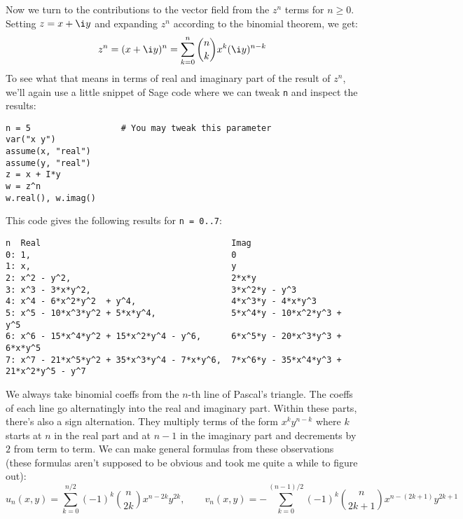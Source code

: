 \documentclass[12pt]{article}
\begin{document}
\medskip
Now we turn to the contributions to the vector field from the $z^n$ terms for $n \geq 0$. Setting $z = x + \i y$ and expanding $z^n$ according to the binomial theorem, we get:
\begin{equation}
z^n = (x + \i y)^n = \sum_{k=0}^n \binom{n}{k}  x^k (\i y)^{n-k}
\end{equation}
To see what that means in terms of real and imaginary part of the result of $z^n$, we'll again use a little snippet of Sage code where we can tweak \texttt{n} and inspect the results:
\begin{verbatim}
n = 5	               # You may tweak this parameter
var("x y")
assume(x, "real")
assume(y, "real")
z = x + I*y
w = z^n
w.real(), w.imag()
\end{verbatim}
This code gives the following results for \texttt{n = 0..7}:
\begin{verbatim}
n  Real                                      Imag
0: 1,                                        0 
1: x,                                        y
2: x^2 - y^2,                                2*x*y
3: x^3 - 3*x*y^2,                            3*x^2*y - y^3
4: x^4 - 6*x^2*y^2  + y^4,                   4*x^3*y - 4*x*y^3
5: x^5 - 10*x^3*y^2 + 5*x*y^4,               5*x^4*y - 10*x^2*y^3 + y^5
6: x^6 - 15*x^4*y^2 + 15*x^2*y^4 - y^6,      6*x^5*y - 20*x^3*y^3 + 6*x*y^5
7: x^7 - 21*x^5*y^2 + 35*x^3*y^4 - 7*x*y^6,  7*x^6*y - 35*x^4*y^3 + 21*x^2*y^5 - y^7
\end{verbatim}
We always take binomial coeffs from the $n$-th line of Pascal's triangle. The coeffs of each line go alternatingly into the real and imaginary part. Within these parts, there's also a sign alternation. They multiply terms of the form $x^k y^{n-k}$ where $k$ starts at $n$ in the real part and at $n-1$ in the imaginary part and decrements by $2$ from term to term. We can make general formulas from these observations (these formulas aren't supposed to be obvious and took me quite a while to figure out):
\begin{equation}
\label{Eq:PolyaFieldLaurentPowTerm}
\boxed{		
u_n(x,y) = \sum_{k=0}^{n/2} (-1)^k \binom{n}{2 k} x^{n-2k} y^{2k}
,\qquad
v_n(x,y) = -\sum_{k=0}^{(n-1)/2} (-1)^k \binom{n}{2k+1} x^{n-(2k+1)} y^{2k+1}
}
\end{equation}
\end{document}
